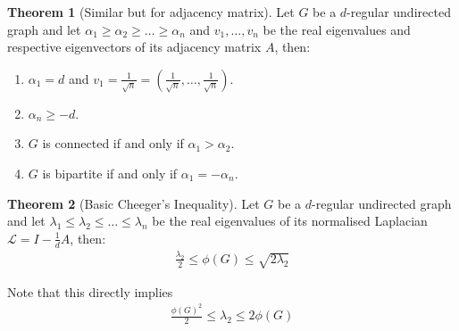 \documentclass{article}
\theoremstyle{definition}
\newtheorem{theorem}{Theorem}[section]
\begin{document}
\begin{theorem}[Similar but for adjacency matrix]
  Let $G$ be a $d$-regular undirected graph and let $\alpha_1 \ge \alpha_2 \ge \dots \ge \alpha_n$ and
  $v_1, \dots, v_n$ be the real eigenvalues and respective eigenvectors of its adjacency matrix $A$, then:
  \begin{enumerate}
    \item $\alpha_1 = d$ and $v_1 = \frac{1}{\sqrt{n}} = (\frac{1}{\sqrt{n}}, \dots, \frac{1}{\sqrt{n}})$.
    \item $\alpha_n \ge -d$.
    \item $G$ is connected if and only if $\alpha_1 > \alpha_2$.
    \item $G$ is bipartite if and only if $\alpha_1 = -\alpha_n$.
  \end{enumerate}
\end{theorem}

\begin{theorem}[Basic Cheeger's Inequality]
  Let $G$ be a $d$-regular undirected graph and let $\lambda_1 \le \lambda_2 \le \dots \le \lambda_n$ be the
  real eigenvalues of its normalised Laplacian $\mathcal{L} = I - \frac{1}{d}A$, then:
  \begin{align*}
    \frac{\lambda_2}{2} \le \phi(G) \le \sqrt{2 \lambda_2}
  \end{align*}
\end{theorem}
Note that this directly implies
\begin{align}
  \frac{{\phi(G)}^2}{2} \le \lambda_2 \le 2 \phi(G)
\end{align}


\end{document}
